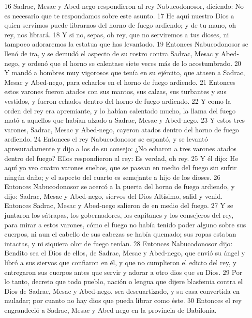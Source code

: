 16 Sadrac, Mesac y Abed-nego respondieron al rey Nabucodonosor, diciendo: No es necesario que te respondamos sobre este asunto.
17 He aquí nuestro Dios a quien servimos puede librarnos del horno de fuego ardiendo; y de tu mano, oh rey, nos librará.
18 Y si no, sepas, oh rey, que no serviremos a tus dioses, ni tampoco adoraremos la estatua que has levantado.
19 Entonces Nabucodonosor se llenó de ira, y se demudó el aspecto de su rostro contra Sadrac, Mesac y Abed-nego, y ordenó que el horno se calentase siete veces más de lo acostumbrado.
20 Y mandó a hombres muy vigorosos que tenía en su ejército, que atasen a Sadrac, Mesac y Abed-nego, para echarlos en el horno de fuego ardiendo.
21 Entonces estos varones fueron atados con sus mantos, sus calzas, sus turbantes y sus vestidos, y fueron echados dentro del horno de fuego ardiendo.
22 Y como la orden del rey era apremiante, y lo habían calentado mucho, la llama del fuego mató a aquellos que habían alzado a Sadrac, Mesac y Abed-nego.
23 Y estos tres varones, Sadrac, Mesac y Abed-nego, cayeron atados dentro del horno de fuego ardiendo.
24 Entonces el rey Nabucodonosor se espantó, y se levantó apresuradamente y dijo a los de su consejo: ¿No echaron a tres varones atados dentro del fuego? Ellos respondieron al rey: Es verdad, oh rey.
25 Y él dijo: He aquí yo veo cuatro varones sueltos, que se pasean en medio del fuego sin sufrir ningún daño; y el aspecto del cuarto es semejante a hijo de los dioses.
26 Entonces Nabucodonosor se acercó a la puerta del horno de fuego ardiendo, y dijo: Sadrac, Mesac y Abed-nego, siervos del Dios Altísimo, salid y venid. Entonces Sadrac, Mesac y Abed-nego salieron de en medio del fuego.
27 Y se juntaron los sátrapas, los gobernadores, los capitanes y los consejeros del rey, para mirar a estos varones, cómo el fuego no había tenido poder alguno sobre sus cuerpos, ni aun el cabello de sus cabezas se había quemado; sus ropas estaban intactas, y ni siquiera olor de fuego tenían.
28 Entonces Nabucodonosor dijo: Bendito sea el Dios de ellos, de Sadrac, Mesac y Abed-nego, que envió su ángel y libró a sus siervos que confiaron en él, y que no cumplieron el edicto del rey, y entregaron sus cuerpos antes que servir y adorar a otro dios que su Dios.
29 Por lo tanto, decreto que todo pueblo, nación o lengua que dijere blasfemia contra el Dios de Sadrac, Mesac y Abed-nego, sea descuartizado, y su casa convertida en muladar; por cuanto no hay dios que pueda librar como éste.
30 Entonces el rey engrandeció a Sadrac, Mesac y Abed-nego en la provincia de Babilonia.

